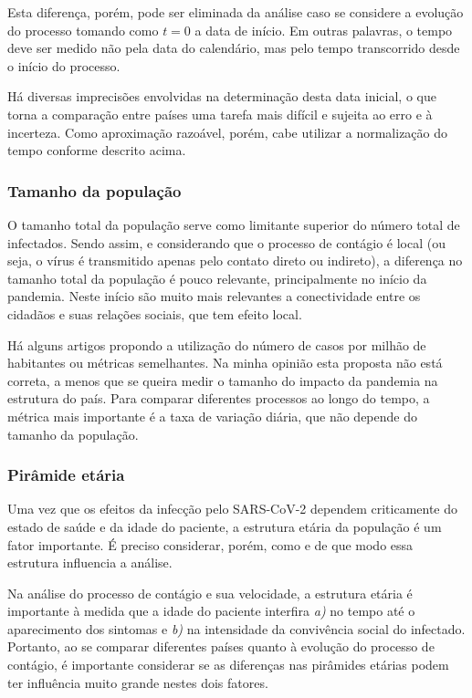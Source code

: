 \documentclass[12pt]{extarticle}
\begin{document}
Esta diferença, porém, pode ser eliminada da análise caso se considere a evolução do processo tomando como $t=0$ a data de início. Em outras palavras, o tempo deve ser medido não pela data do calendário, mas pelo tempo transcorrido desde o início do processo. 

Há diversas imprecisões envolvidas na determinação desta data inicial, o que torna a comparação entre países uma tarefa mais difícil e sujeita ao erro e à incerteza. Como aproximação razoável, porém, cabe utilizar a normalização do tempo conforme descrito acima.

\subsubsection{Tamanho da população}

O tamanho total da população serve como limitante superior do número total de infectados. Sendo assim, e considerando que o processo de contágio é local (ou seja, o vírus é transmitido apenas pelo contato direto ou indireto), a diferença no tamanho total da população é pouco relevante, principalmente no início da pandemia. Neste início são muito mais relevantes a conectividade entre os cidadãos e suas relações sociais, que tem efeito local.

Há alguns artigos propondo a utilização do número de casos por milhão de habitantes ou métricas semelhantes. Na minha opinião esta proposta não está correta, a menos que se queira medir o tamanho do impacto da pandemia na estrutura do país. Para comparar diferentes processos ao longo do tempo, a métrica mais importante é a taxa de variação diária, que não depende do tamanho da população.

\subsubsection{Pirâmide etária}

Uma vez que os efeitos da infecção pelo SARS-CoV-2 dependem criticamente do estado de saúde e da idade do paciente, a estrutura etária da população é um fator importante. É preciso considerar, porém, como e de que modo essa estrutura influencia a análise.

Na análise do processo de contágio e sua velocidade, a estrutura etária é importante à medida que a idade do paciente interfira \textit{a)} no tempo até o aparecimento dos sintomas e \textit{b)} na intensidade da convivência social do infectado. Portanto, ao se comparar diferentes países quanto à evolução do processo de contágio, é importante considerar se as diferenças nas pirâmides etárias podem ter influência muito grande nestes dois fatores. 
\end{document}

